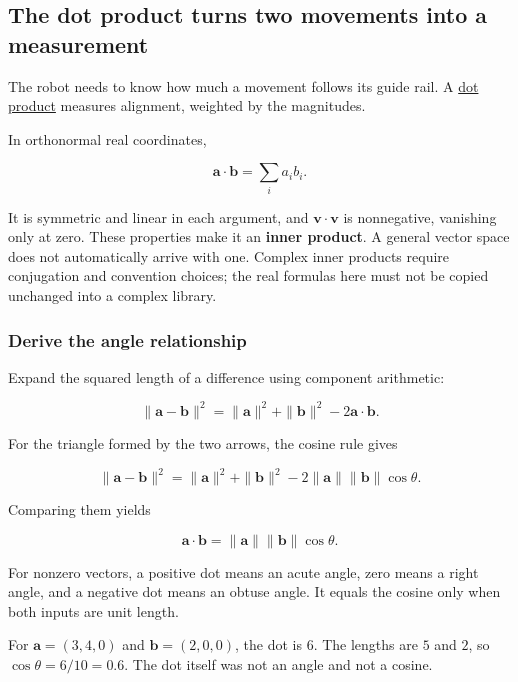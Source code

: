 \subsection{The dot product turns two movements into a measurement}\label{01-foundations-i-ch017-the-dot-product-turns-two-movements-into-a-measurement}

The robot needs to know how much a movement follows its guide rail. A \hyperref[01-foundations-i-ch017-the-dot-product-turns-two-movements-into-a-measurement]{dot product} measures alignment, weighted by the magnitudes.

In orthonormal real coordinates,

\[
\mathbf a\cdot\mathbf b=\sum_i a_i b_i.
\]

It is symmetric and linear in each argument, and \(\mathbf v\cdot\mathbf v\) is nonnegative, vanishing only at zero. These properties make it an \textbf{inner product}. A general vector space does not automatically arrive with one. Complex inner products require conjugation and convention choices; the real formulas here must not be copied unchanged into a complex library.

\subsubsection{Derive the angle relationship}\label{01-foundations-i-ch017-derive-the-angle-relationship}

Expand the squared length of a difference using component arithmetic:

\[
\|\mathbf a-\mathbf b\|^2
=\|\mathbf a\|^2+\|\mathbf b\|^2-2\mathbf a\cdot\mathbf b.
\]

For the triangle formed by the two arrows, the cosine rule gives

\[
\|\mathbf a-\mathbf b\|^2
=\|\mathbf a\|^2+\|\mathbf b\|^2
-2\|\mathbf a\|\|\mathbf b\|\cos\theta.
\]

Comparing them yields

\[
\mathbf a\cdot\mathbf b=\|\mathbf a\|\|\mathbf b\|\cos\theta.
\]

For nonzero vectors, a positive dot means an acute angle, zero means a right angle, and a negative dot means an obtuse angle. It equals the cosine only when both inputs are unit length.

For \(\mathbf a=(3,4,0)\) and \(\mathbf b=(2,0,0)\), the dot is \(6\). The lengths are \(5\) and \(2\), so \(\cos\theta=6/10=0.6\). The dot itself was not an angle and not a cosine.

